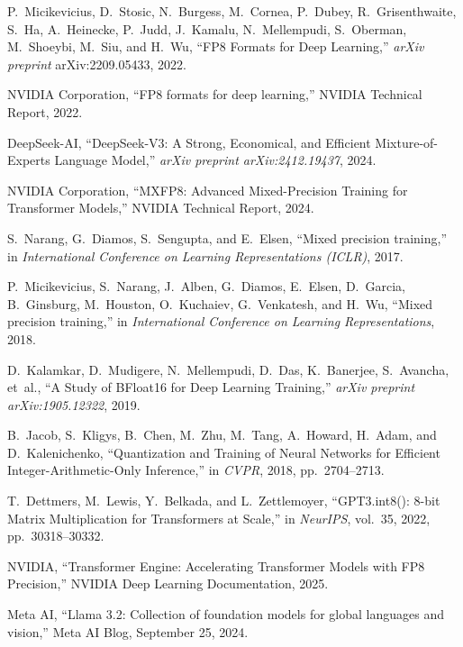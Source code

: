 \documentclass[conference]{IEEEtran}
\begin{document}
\begin{thebibliography}{40}

P.~Micikevicius, D.~Stosic, N.~Burgess, M.~Cornea, P.~Dubey, R.~Grisenthwaite, 
S.~Ha, A.~Heinecke, P.~Judd, J.~Kamalu, N.~Mellempudi, S.~Oberman, 
M.~Shoeybi, M.~Siu, and H.~Wu, 
``FP8 Formats for Deep Learning,'' 
\emph{arXiv preprint} arXiv:2209.05433, 2022.

NVIDIA Corporation,
``FP8 formats for deep learning,''
NVIDIA Technical Report, 2022.

DeepSeek-AI,
``DeepSeek-V3: A Strong, Economical, and Efficient Mixture-of-Experts Language Model,''
\emph{arXiv preprint arXiv:2412.19437}, 2024.

NVIDIA Corporation,
``MXFP8: Advanced Mixed-Precision Training for Transformer Models,''
NVIDIA Technical Report, 2024.

S.~Narang, G.~Diamos, S.~Sengupta, and E.~Elsen,
``Mixed precision training,''
in \emph{International Conference on Learning Representations (ICLR)}, 2017.

P.~Micikevicius, S.~Narang, J.~Alben, G.~Diamos, E.~Elsen, D.~Garcia, B.~Ginsburg, M.~Houston, O.~Kuchaiev, G.~Venkatesh, and H.~Wu,
``Mixed precision training,''
in \emph{International Conference on Learning Representations}, 2018.

D.~Kalamkar, D.~Mudigere, N.~Mellempudi, D.~Das, K.~Banerjee, S.~Avancha, et~al.,
``A Study of BFloat16 for Deep Learning Training,''
\emph{arXiv preprint arXiv:1905.12322}, 2019.

B.~Jacob, S.~Kligys, B.~Chen, M.~Zhu, M.~Tang, A.~Howard, H.~Adam, and D.~Kalenichenko,
``Quantization and Training of Neural Networks for Efficient Integer-Arithmetic-Only Inference,''
in \emph{CVPR}, 2018, pp.~2704--2713.

T.~Dettmers, M.~Lewis, Y.~Belkada, and L.~Zettlemoyer,
``GPT3.int8(): 8-bit Matrix Multiplication for Transformers at Scale,''
in \emph{NeurIPS}, vol.~35, 2022, pp.~30318--30332.

NVIDIA,
``Transformer Engine: Accelerating Transformer Models with FP8 Precision,''
NVIDIA Deep Learning Documentation, 2025.

Meta AI, 
``Llama 3.2: Collection of foundation models for global languages and vision,'' 
Meta AI Blog, September 25, 2024.


\end{thebibliography}
\end{document}
